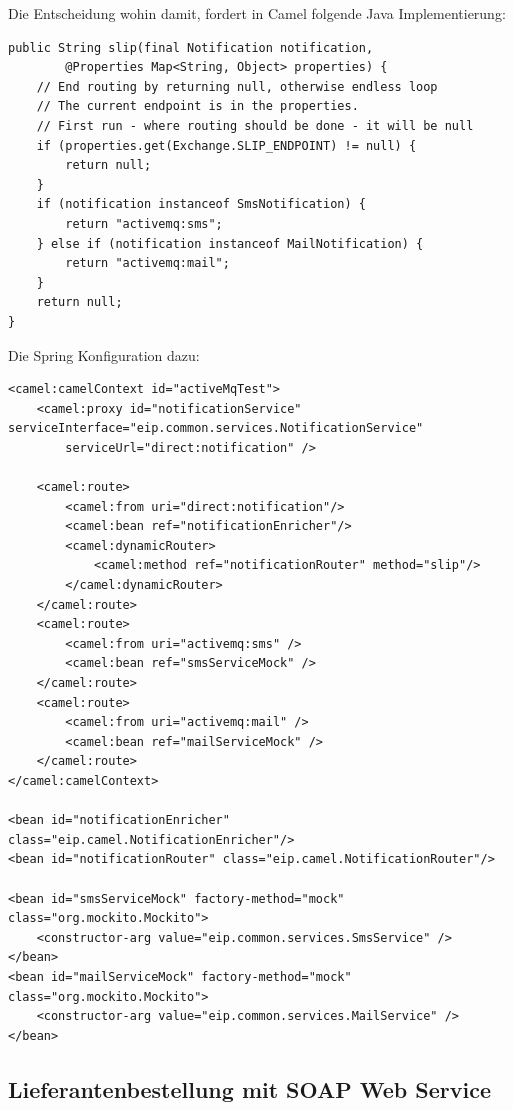 \documentclass[12pt,a4paper,ngerman]{article}
\begin{document}
Die Entscheidung wohin damit, fordert in Camel folgende Java
Implementierung:

\begin{lstlisting}
public String slip(final Notification notification,
        @Properties Map<String, Object> properties) {
    // End routing by returning null, otherwise endless loop
    // The current endpoint is in the properties.
    // First run - where routing should be done - it will be null
    if (properties.get(Exchange.SLIP_ENDPOINT) != null) {
        return null;
    }
    if (notification instanceof SmsNotification) {
        return "activemq:sms";
    } else if (notification instanceof MailNotification) {
        return "activemq:mail";
    }
    return null;
}
\end{lstlisting}

Die Spring Konfiguration dazu:

\begin{lstlisting}
<camel:camelContext id="activeMqTest">
    <camel:proxy id="notificationService" serviceInterface="eip.common.services.NotificationService"
        serviceUrl="direct:notification" />

    <camel:route>
        <camel:from uri="direct:notification"/>
        <camel:bean ref="notificationEnricher"/>
        <camel:dynamicRouter>
            <camel:method ref="notificationRouter" method="slip"/>
        </camel:dynamicRouter>
    </camel:route>
    <camel:route>
        <camel:from uri="activemq:sms" />
        <camel:bean ref="smsServiceMock" />
    </camel:route>
    <camel:route>
        <camel:from uri="activemq:mail" />
        <camel:bean ref="mailServiceMock" />
    </camel:route>
</camel:camelContext>

<bean id="notificationEnricher" class="eip.camel.NotificationEnricher"/>
<bean id="notificationRouter" class="eip.camel.NotificationRouter"/>

<bean id="smsServiceMock" factory-method="mock" class="org.mockito.Mockito">
    <constructor-arg value="eip.common.services.SmsService" />
</bean>
<bean id="mailServiceMock" factory-method="mock" class="org.mockito.Mockito">
    <constructor-arg value="eip.common.services.MailService" />
</bean>
\end{lstlisting}

\subsection{Lieferantenbestellung mit SOAP Web Service}
\end{document}
